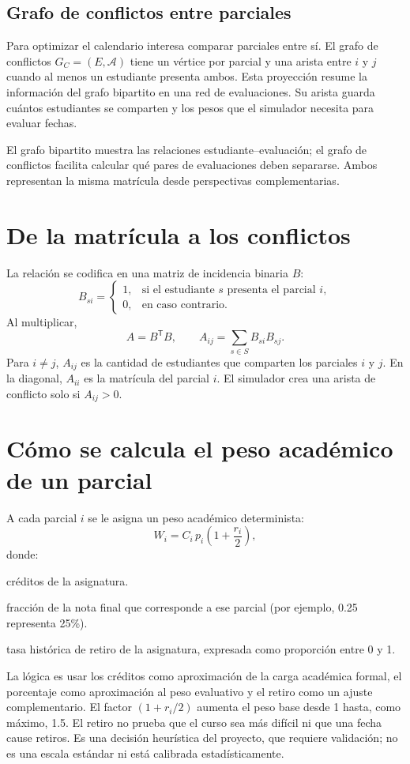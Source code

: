 \documentclass[11pt,a4paper]{article}
\begin{document}
\subsection{Grafo de conflictos entre parciales}
Para optimizar el calendario interesa comparar parciales entre sí. El grafo de conflictos $G_C=(E,\mathcal A)$ tiene un vértice por parcial y una arista entre $i$ y $j$ cuando al menos un estudiante presenta ambos. Esta proyección resume la información del grafo bipartito en una red de evaluaciones. Su arista guarda cuántos estudiantes se comparten y los pesos que el simulador necesita para evaluar fechas.

El grafo bipartito muestra las relaciones estudiante--evaluación; el grafo de conflictos facilita calcular qué pares de evaluaciones deben separarse. Ambos representan la misma matrícula desde perspectivas complementarias.

\section{De la matrícula a los conflictos}
La relación se codifica en una matriz de incidencia binaria $B$:
\[
B_{si}=\begin{cases}
1,&\text{si el estudiante }s\text{ presenta el parcial }i,\\
0,&\text{en caso contrario.}
\end{cases}
\]
Al multiplicar,
\[
A=B^{\mathsf T}B,\qquad
A_{ij}=\sum_{s\in S}B_{si}B_{sj}.
\]
Para $i\ne j$, $A_{ij}$ es la cantidad de estudiantes que comparten los parciales $i$ y $j$. En la diagonal, $A_{ii}$ es la matrícula del parcial $i$. El simulador crea una arista de conflicto solo si $A_{ij}>0$.

\section{Cómo se calcula el peso académico de un parcial}
A cada parcial $i$ se le asigna un peso académico determinista:
\[
W_i=C_i\,p_i\left(1+\frac{r_i}{2}\right),
\]
donde:
\begin{description}[leftmargin=2.8cm,style=nextline]
    \item[$C_i$] créditos de la asignatura.
    \item[$p_i$] fracción de la nota final que corresponde a ese parcial (por ejemplo, 0.25 representa 25\%).
    \item[$r_i$] tasa histórica de retiro de la asignatura, expresada como proporción entre 0 y 1.
\end{description}
La lógica es usar los créditos como aproximación de la carga académica formal, el porcentaje como aproximación al peso evaluativo y el retiro como un ajuste complementario. El factor $(1+r_i/2)$ aumenta el peso base desde 1 hasta, como máximo, 1.5. El retiro no prueba que el curso sea más difícil ni que una fecha cause retiros. Es una decisión heurística del proyecto, que requiere validación; no es una escala estándar ni está calibrada estadísticamente.
\end{document}
